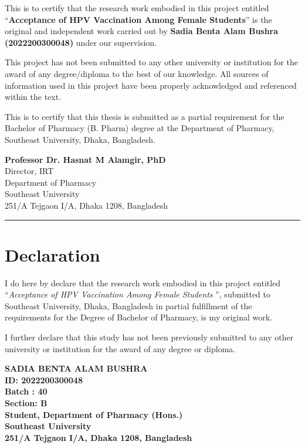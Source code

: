 This is to certify that the research work embodied in this project entitled ``\textbf{Acceptance of HPV Vaccination Among Female Students}'' is the original and independent work carried out by \textbf{Sadia Benta Alam Bushra (2022200300048)} under our supervision.

This project has not been submitted to any other university or institution for the award of any degree/diploma to the best of our knowledge. All sources of information used in this project have been properly acknowledged and referenced within the text.

This is to certify that this thesis is submitted as a partial requirement for the Bachelor of Pharmacy (B. Pharm) degree at the Department of Pharmacy, Southeast University, Dhaka, Bangladesh.

\vspace{8cm}

\noindent
\textbf{Professor Dr. Hasnat M Alamgir, PhD}\\
Director, IRT\\
Department of Pharmacy\\
Southeast University\\
251/A Tejgaon I/A, Dhaka 1208, Bangladesh

\vfill
\noindent\rule{\textwidth}{0.5pt}
\clearpage

\chapter*{Declaration}
I do here by declare that the research work embodied in this project entitled ``\textit{Acceptance of HPV Vaccination Among Female
Students }'', submitted to Southeast University, Dhaka, Bangladesh in partial fulfillment of the requirements for the Degree of Bachelor of Pharmacy, is my original work.

I further declare that this study has not been previously submitted to any other university or institution for the award of any degree or diploma.

\vspace{8cm}

\noindent
\textbf{SADIA BENTA ALAM BUSHRA}\\
\textbf{ID: 2022200300048}\\
\textbf{Batch : 40}\\
\textbf{Section: B}\\
\textbf{Student, Department of Pharmacy (Hons.)}\\
\textbf{Southeast University}\\
\textbf{251/A Tejgaon I/A, Dhaka 1208, Bangladesh}

